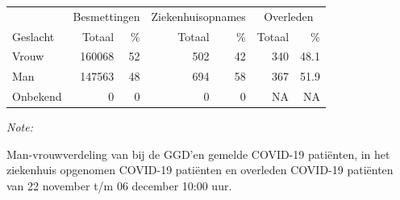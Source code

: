 \documentclass[
  english,
  man,floatsintext]{apa6}
\begin{document}
\newpage

\begin{table}
\centering\begingroup\fontsize{11}{13}\selectfont

\begin{threeparttable}
\begin{tabular}{lrrrrrr}
\toprule
\multicolumn{1}{c}{ } & \multicolumn{2}{c}{Besmettingen} & \multicolumn{2}{c}{Ziekenhuisopnames} & \multicolumn{2}{c}{Overleden} \\
\cmidrule(l{3pt}r{3pt}){2-3} \cmidrule(l{3pt}r{3pt}){4-5} \cmidrule(l{3pt}r{3pt}){6-7}
Geslacht & Totaal & \% & Totaal & \% & Totaal & \%\\
\midrule
Vrouw & 160068 & 52 & 502 & 42 & 340 & 48.1\\
Man & 147563 & 48 & 694 & 58 & 367 & 51.9\\
Onbekend & 0 & 0 & 0 & 0 & NA & NA\\
\bottomrule
\end{tabular}
\begin{tablenotes}
\item \textit{Note: } 
\item Man-vrouwverdeling van bij de GGD’en gemelde COVID-19 patiënten, in het ziekenhuis opgenomen COVID-19 patiënten en overleden COVID-19 patiënten van 22 november t/m 06 december 10:00 uur.
\end{tablenotes}
\end{threeparttable}
\endgroup{}
\end{table}
\newpage
\end{document}
